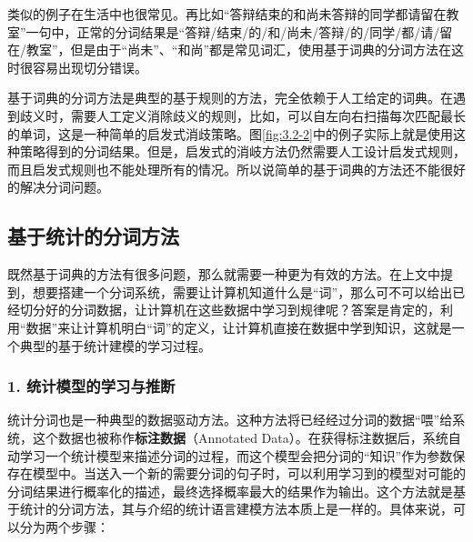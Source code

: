 \parinterval 类似的例子在生活中也很常见。再比如“答辩结束的和尚未答辩的同学都请留在教室”一句中，正常的分词结果是“答辩/结束/的/和/尚未/答辩/的/同学/都/请/留在/教室”，但是由于“尚未”、“和尚”都是常见词汇，使用基于词典的分词方法在这时很容易出现切分错误。

\parinterval 基于词典的分词方法是典型的基于规则的方法，完全依赖于人工给定的词典。在遇到歧义时，需要人工定义消除歧义的规则，比如，可以自左向右扫描每次匹配最长的单词，这是一种简单的启发式消歧策略。图\ref{fig:3.2-2}中的例子实际上就是使用这种策略得到的分词结果。但是，启发式的消岐方法仍然需要人工设计启发式规则，而且启发式规则也不能处理所有的情况。所以说简单的基于词典的方法还不能很好的解决分词问题。


\subsection{基于统计的分词方法}

\parinterval 既然基于词典的方法有很多问题，那么就需要一种更为有效的方法。在上文中提到，想要搭建一个分词系统，需要让计算机知道什么是“词”，那么可不可以给出已经切分好的分词数据，让计算机在这些数据中学习到规律呢？答案是肯定的，利用“数据”来让计算机明白“词”的定义，让计算机直接在数据中学到知识，这就是一个典型的基于统计建模的学习过程。


\subsubsection{1. 统计模型的学习与推断}

\parinterval 统计分词也是一种典型的数据驱动方法。这种方法将已经经过分词的数据“喂”给系统，这个数据也被称作{\small\sffamily\bfseries{标注数据}}（Annotated Data）。在获得标注数据后，系统自动学习一个统计模型来描述分词的过程，而这个模型会把分词的“知识”作为参数保存在模型中。当送入一个新的需要分词的句子时，可以利用学习到的模型对可能的分词结果进行概率化的描述，最终选择概率最大的结果作为输出。这个方法就是基于统计的分词方法，其与{\chaptertwo}介绍的统计语言建模方法本质上是一样的。具体来说，可以分为两个步骤：

